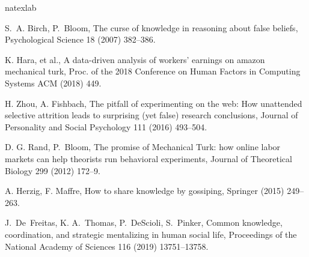 \documentclass[a4paper,superscriptaddress,nofootinbib]{revtex4}
\begin{document}
\begin{thebibliography}{71}\small
\expandafter\ifx\csname natexlab\endcsname\relax\def\natexlab#1{#1}\fi
\providecommand{\bibinfo}[2]{#2}
\ifx\xfnm\relax \def\xfnm[#1]{\unskip,\space#1}\fi

\bibinfo{author}{S.~A. Birch}, \bibinfo{author}{P.~Bloom},
\newblock \bibinfo{title}{The curse of knowledge in reasoning about false
  beliefs},
\newblock \bibinfo{journal}{Psychological Science} \bibinfo{volume}{18}
  (\bibinfo{year}{2007}) \bibinfo{pages}{382--386}.

\bibinfo{author}{K. Hara}, \bibinfo{author}{et al.},
\newblock \bibinfo{title}{A data-driven analysis of workers' earnings on amazon
  mechanical turk},
\newblock \bibinfo{journal}{Proc. of the 2018 Conference on Human Factors in
  Computing Systems ACM}
  (\bibinfo{year}{2018}) \bibinfo{pages}{449}.

\bibinfo{author}{H. Zhou}, \bibinfo{author}{A. Fishbach},
\newblock \bibinfo{title}{The pitfall of experimenting on the web: How
  unattended selective attrition leads to surprising (yet false) research
  conclusions},
\newblock \bibinfo{journal}{Journal of Personality and Social Psychology} \bibinfo{volume}{111}
  (\bibinfo{year}{2016}) \bibinfo{pages}{493--504}.

\bibinfo{author}{D. G. Rand}, \bibinfo{author}{P.~Bloom},
\newblock \bibinfo{title}{The promise of {M}echanical {T}urk: how online labor markets can
  help theorists run behavioral experiments},
\newblock \bibinfo{journal}{Journal of Theoretical Biology} \bibinfo{volume}{299}
  (\bibinfo{year}{2012}) \bibinfo{pages}{172--9}.

\bibinfo{author}{A. Herzig}, \bibinfo{author}{F. Maffre},
\newblock \bibinfo{title}{How to share knowledge by gossiping},
\newblock \bibinfo{journal}{Springer}
  (\bibinfo{year}{2015}) \bibinfo{pages}{249--263}.

\bibinfo{author}{J.~De~Freitas}, \bibinfo{author}{K. A.~Thomas},
  \bibinfo{author}{P.~DeScioli}, \bibinfo{author}{S.~Pinker},
\newblock \bibinfo{title}{Common knowledge, coordination, and strategic
  mentalizing in human social life},
\newblock \bibinfo{journal}{Proceedings of the National Academy of Sciences}
  \bibinfo{volume}{116} (\bibinfo{year}{2019}) \bibinfo{pages}{13751--13758}.
\end{thebibliography}
\end{document}
